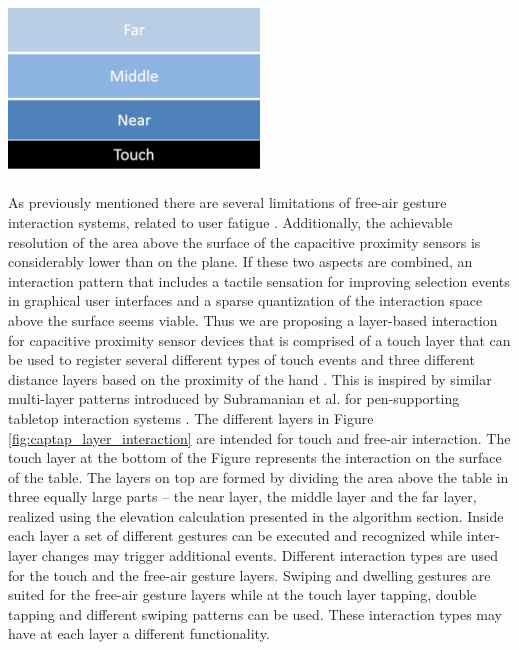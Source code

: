 \begin{minipage}{\linewidth}
\centering
\includegraphics[width=0.5\textwidth]{images/captap_layer_interaction}
\label{fig:captap_layer_interaction}
\end{minipage}

As previously mentioned there are several limitations of free-air gesture interaction systems, related to user fatigue \cite{Baudel1993,lenman2002}. Additionally, the achievable resolution of the area above the surface of the capacitive proximity sensors is considerably lower than on the plane. If these two aspects are combined, an interaction pattern that includes a tactile sensation for improving selection events in graphical user interfaces and a sparse quantization of the interaction space above the surface seems viable. Thus we are proposing a layer-based interaction for capacitive proximity sensor devices that is comprised of a touch layer that can be used to register several different types of touch events and three different distance layers based on the proximity of the hand \cite{Braun2013captap}. This is inspired by similar multi-layer patterns introduced by Subramanian et al. for pen-supporting tabletop interaction systems \cite{subramanian2006multi}. The different layers in Figure \ref{fig:captap_layer_interaction} are intended for touch and free-air interaction. The touch layer at the bottom of the Figure represents the interaction on the surface of the table. The layers on top are formed by dividing the area above the table in three equally large parts – the near layer, the middle layer and the far layer, realized using the elevation calculation presented in the algorithm section. Inside each layer a set of different gestures can be executed and recognized while inter-layer changes may trigger additional events. Different interaction types are used for the touch and the free-air gesture layers. Swiping and dwelling gestures are suited for the free-air gesture layers while at the touch layer tapping, double tapping and different swiping patterns can be used. These interaction types may have at each layer a different functionality.
